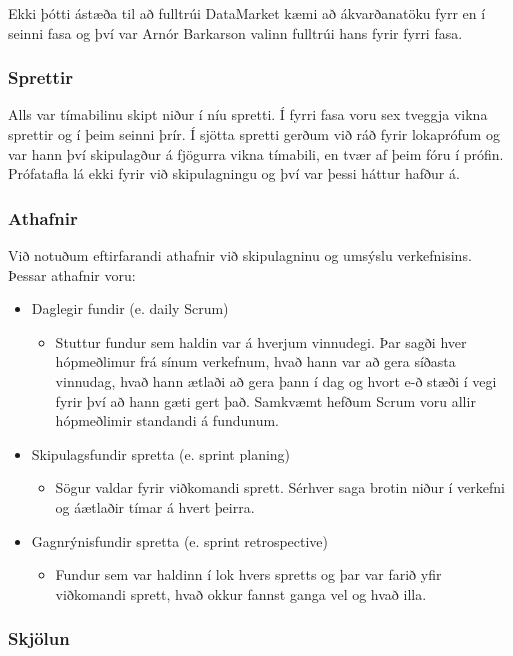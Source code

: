 \documentclass{article}
\begin{document}
Ekki þótti ástæða til að fulltrúi 
DataMarket kæmi að ákvarðanatöku fyrr en í seinni fasa og því var Arnór Barkarson 
valinn fulltrúi hans fyrir fyrri fasa.

\subsubsection{Sprettir}
\label{sec:sprettir}
Alls var tímabilinu skipt niður í níu spretti. Í fyrri fasa voru sex 
tveggja vikna sprettir og í þeim seinni þrír. Í sjötta spretti gerðum við ráð fyrir lokaprófum og var hann því
skipulagður á fjögurra vikna tímabili, 
en tvær af þeim fóru í prófin. Prófatafla lá ekki fyrir við skipulagningu og því 
var þessi háttur hafður á. 

\subsubsection{Athafnir}

Við notuðum eftirfarandi athafnir við skipulagninu og umsýslu verkefnisins.
Þessar athafnir voru: 

\begin{itemize}
\item Daglegir fundir (e. daily Scrum)
\begin{itemize}
\item Stuttur fundur sem haldin var á hverjum vinnudegi. Þar sagði hver hópmeðlimur frá sínum verkefnum, hvað hann var að gera síðasta vinnudag, hvað hann ætlaði að gera þann í dag og hvort e-ð stæði í vegi fyrir því að hann gæti gert það. Samkvæmt hefðum Scrum voru allir hópmeðlimir standandi á fundunum.
\end{itemize}
\item Skipulagsfundir spretta (e. sprint planing)
\begin{itemize}
\item Sögur valdar fyrir viðkomandi sprett. Sérhver saga brotin niður í verkefni og áætlaðir tímar á hvert þeirra. 
\end{itemize}
\item Gagnrýnisfundir spretta (e. sprint retrospective)
\begin{itemize}
\item Fundur sem var haldinn í lok hvers spretts og þar var farið yfir viðkomandi sprett, hvað okkur fannst ganga vel og hvað illa. 
\end{itemize}
\end{itemize}

\subsubsection{Skjölun}
\end{document}
